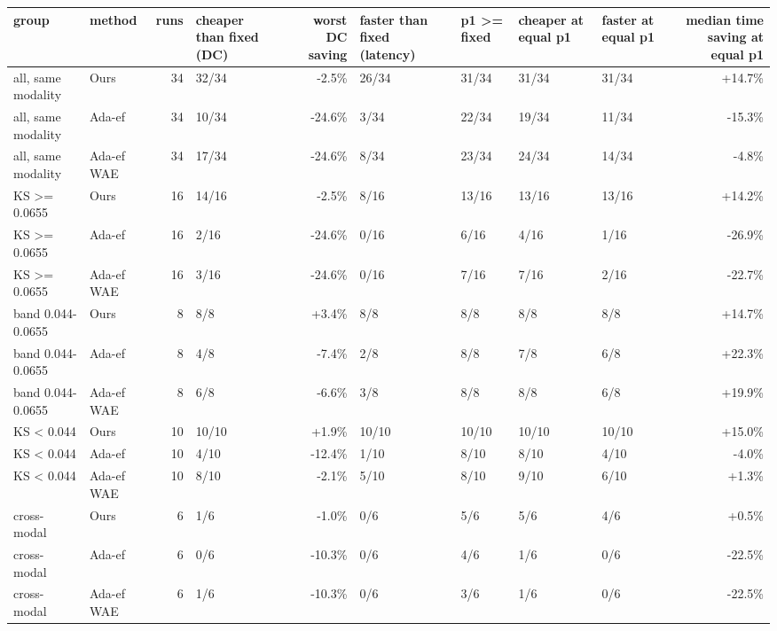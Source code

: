 \begin{tabular}{llrlrllllr}
\toprule
group & method & runs & cheaper than fixed (DC) & worst DC saving & faster than fixed (latency) & p1 >= fixed & cheaper at equal p1 & faster at equal p1 & median time saving at equal p1 \\
\midrule
all, same modality & Ours & 34 & 32/34 & -2.5\% & 26/34 & 31/34 & 31/34 & 31/34 & +14.7\% \\
all, same modality & Ada-ef & 34 & 10/34 & -24.6\% & 3/34 & 22/34 & 19/34 & 11/34 & -15.3\% \\
all, same modality & Ada-ef WAE & 34 & 17/34 & -24.6\% & 8/34 & 23/34 & 24/34 & 14/34 & -4.8\% \\
KS >= 0.0655 & Ours & 16 & 14/16 & -2.5\% & 8/16 & 13/16 & 13/16 & 13/16 & +14.2\% \\
KS >= 0.0655 & Ada-ef & 16 & 2/16 & -24.6\% & 0/16 & 6/16 & 4/16 & 1/16 & -26.9\% \\
KS >= 0.0655 & Ada-ef WAE & 16 & 3/16 & -24.6\% & 0/16 & 7/16 & 7/16 & 2/16 & -22.7\% \\
band 0.044-0.0655 & Ours & 8 & 8/8 & +3.4\% & 8/8 & 8/8 & 8/8 & 8/8 & +14.7\% \\
band 0.044-0.0655 & Ada-ef & 8 & 4/8 & -7.4\% & 2/8 & 8/8 & 7/8 & 6/8 & +22.3\% \\
band 0.044-0.0655 & Ada-ef WAE & 8 & 6/8 & -6.6\% & 3/8 & 8/8 & 8/8 & 6/8 & +19.9\% \\
KS < 0.044 & Ours & 10 & 10/10 & +1.9\% & 10/10 & 10/10 & 10/10 & 10/10 & +15.0\% \\
KS < 0.044 & Ada-ef & 10 & 4/10 & -12.4\% & 1/10 & 8/10 & 8/10 & 4/10 & -4.0\% \\
KS < 0.044 & Ada-ef WAE & 10 & 8/10 & -2.1\% & 5/10 & 8/10 & 9/10 & 6/10 & +1.3\% \\
cross-modal & Ours & 6 & 1/6 & -1.0\% & 0/6 & 5/6 & 5/6 & 4/6 & +0.5\% \\
cross-modal & Ada-ef & 6 & 0/6 & -10.3\% & 0/6 & 4/6 & 1/6 & 0/6 & -22.5\% \\
cross-modal & Ada-ef WAE & 6 & 1/6 & -10.3\% & 0/6 & 3/6 & 1/6 & 0/6 & -22.5\% \\
\bottomrule
\end{tabular}
